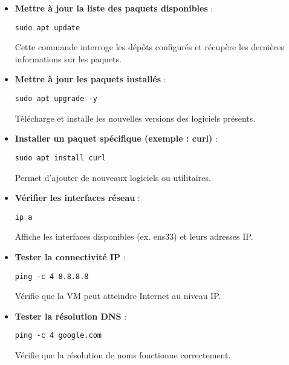 \documentclass[11pt,a4paper]{article}
\begin{document}
\begin{tcolorbox}[title={1. Commandes de gestion des paquets (APT)}]
\begin{itemize}
  \item \textbf{Mettre à jour la liste des paquets disponibles} :
\begin{verbatim}
sudo apt update
\end{verbatim}
Cette commande interroge les dépôts configurés et récupère les dernières informations sur les paquets.

  \item \textbf{Mettre à jour les paquets installés} :
\begin{verbatim}
sudo apt upgrade -y
\end{verbatim}
Télécharge et installe les nouvelles versions des logiciels présents.

  \item \textbf{Installer un paquet spécifique (exemple : curl)} :
\begin{verbatim}
sudo apt install curl
\end{verbatim}
Permet d’ajouter de nouveaux logiciels ou utilitaires.
\end{itemize}
\end{tcolorbox}

\begin{tcolorbox}[title={2. Commandes réseau}]
\begin{itemize}
  \item \textbf{Vérifier les interfaces réseau} :
\begin{verbatim}
ip a
\end{verbatim}
Affiche les interfaces disponibles (ex. ens33) et leurs adresses IP.

  \item \textbf{Tester la connectivité IP} :
\begin{verbatim}
ping -c 4 8.8.8.8
\end{verbatim}
Vérifie que la VM peut atteindre Internet au niveau IP.

  \item \textbf{Tester la résolution DNS} :
\begin{verbatim}
ping -c 4 google.com
\end{verbatim}
Vérifie que la résolution de noms fonctionne correctement.
\end{itemize}
\end{tcolorbox}
\end{document}

